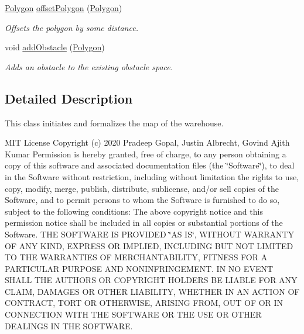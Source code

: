 \begin{DoxyCompactItemize}
\hyperlink{class_polygon}{Polygon} \hyperlink{class_map_af7f034da743cac798c603ca9366f0dab}{offset\+Polygon} (\hyperlink{class_polygon}{Polygon})
\begin{DoxyCompactList}\small\item\em Offsets the polygon by some distance. \end{DoxyCompactList}\item 
void \hyperlink{class_map_a2768806fac4c9f0e3a7d0fa5faca825f}{add\+Obstacle} (\hyperlink{class_polygon}{Polygon})
\begin{DoxyCompactList}\small\item\em Adds an obstacle to the existing obstacle space. \end{DoxyCompactList}\end{DoxyCompactItemize}


\subsection{Detailed Description}
This class initiates and formalizes the map of the warehouse. 

M\+IT License Copyright (c) 2020 Pradeep Gopal, Justin Albrecht, Govind Ajith Kumar Permission is hereby granted, free of charge, to any person obtaining a copy of this software and associated documentation files (the \char`\"{}\+Software\char`\"{}), to deal in the Software without restriction, including without limitation the rights to use, copy, modify, merge, publish, distribute, sublicense, and/or sell copies of the Software, and to permit persons to whom the Software is furnished to do so, subject to the following conditions\+: The above copyright notice and this permission notice shall be included in all copies or substantial portions of the Software. T\+HE S\+O\+F\+T\+W\+A\+RE IS P\+R\+O\+V\+I\+D\+ED \char`\"{}\+A\+S I\+S\char`\"{}, W\+I\+T\+H\+O\+UT W\+A\+R\+R\+A\+N\+TY OF A\+NY K\+I\+ND, E\+X\+P\+R\+E\+SS OR I\+M\+P\+L\+I\+ED, I\+N\+C\+L\+U\+D\+I\+NG B\+UT N\+OT L\+I\+M\+I\+T\+ED TO T\+HE W\+A\+R\+R\+A\+N\+T\+I\+ES OF M\+E\+R\+C\+H\+A\+N\+T\+A\+B\+I\+L\+I\+TY, F\+I\+T\+N\+E\+SS F\+OR A P\+A\+R\+T\+I\+C\+U\+L\+AR P\+U\+R\+P\+O\+SE A\+ND N\+O\+N\+I\+N\+F\+R\+I\+N\+G\+E\+M\+E\+NT. IN NO E\+V\+E\+NT S\+H\+A\+LL T\+HE A\+U\+T\+H\+O\+RS OR C\+O\+P\+Y\+R\+I\+G\+HT H\+O\+L\+D\+E\+RS BE L\+I\+A\+B\+LE F\+OR A\+NY C\+L\+A\+IM, D\+A\+M\+A\+G\+ES OR O\+T\+H\+ER L\+I\+A\+B\+I\+L\+I\+TY, W\+H\+E\+T\+H\+ER IN AN A\+C\+T\+I\+ON OF C\+O\+N\+T\+R\+A\+CT, T\+O\+RT OR O\+T\+H\+E\+R\+W\+I\+SE, A\+R\+I\+S\+I\+NG F\+R\+OM, O\+UT OF OR IN C\+O\+N\+N\+E\+C\+T\+I\+ON W\+I\+TH T\+HE S\+O\+F\+T\+W\+A\+RE OR T\+HE U\+SE OR O\+T\+H\+ER D\+E\+A\+L\+I\+N\+GS IN T\+HE S\+O\+F\+T\+W\+A\+RE. 

